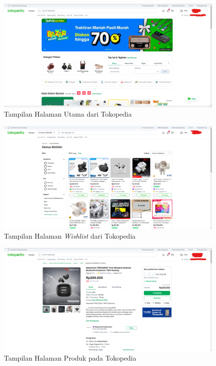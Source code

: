 \documentclass[a4paper]{article}
\begin{document}
\begin{itemize}
\begin{enumerate}
        \begin{figure}[h]
            \centering
            \includegraphics[scale=0.25]{images/ss tokped/Homepage Tokped.png}
            \caption{Tampilan Halaman Utama dari Tokopedia}
        \end{figure}
        \newpage
        \begin{figure}[h]
            \centering
            \includegraphics[scale=0.25]{images/ss tokped/Wishlist Page Tokped.png}
            \caption{Tampilan Halaman \textit{Wishlist} dari Tokopedia}
        \end{figure}

        \begin{figure}[h]
            \centering
            \includegraphics[scale=0.25]{images/ss tokped/Products Page Tokped.png}
            \caption{Tampilan Halaman Produk pada Tokopedia}
        \end{figure}


\end{enumerate}
\end{itemize}
\end{document}
